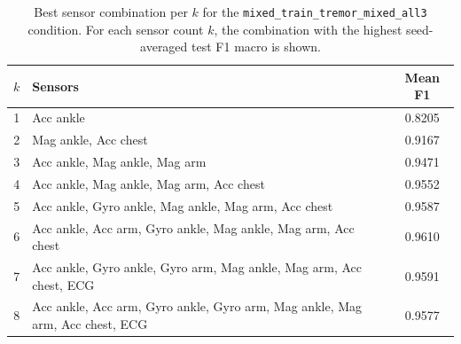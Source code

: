 \begin{table}[H]
    \centering
    \caption{Best sensor combination per $k$ for the \texttt{mixed\_train\_tremor\_mixed\_all3} condition. For each sensor count $k$, the combination with the highest seed-averaged test F1 macro is shown.}
    \label{tab:best_combo_mixed_train_tremor_mixed_all3}
    \begin{tabular}{clc}
        \toprule
        $k$ & \textbf{Sensors} & \textbf{Mean F1} \\
        \midrule
        1 & Acc ankle & 0.8205 \\
        2 & Mag ankle, Acc chest & 0.9167 \\
        3 & Acc ankle, Mag ankle, Mag arm & 0.9471 \\
        4 & Acc ankle, Mag ankle, Mag arm, Acc chest & 0.9552 \\
        5 & Acc ankle, Gyro ankle, Mag ankle, Mag arm, Acc chest & 0.9587 \\
        6 & Acc ankle, Acc arm, Gyro ankle, Mag ankle, Mag arm, Acc chest & 0.9610 \\
        7 & Acc ankle, Gyro ankle, Gyro arm, Mag ankle, Mag arm, Acc chest, ECG & 0.9591 \\
        8 & Acc ankle, Acc arm, Gyro ankle, Gyro arm, Mag ankle, Mag arm, Acc chest, ECG & 0.9577 \\
        \bottomrule
    \end{tabular}
\end{table}